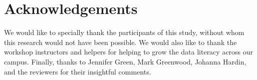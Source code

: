 \documentclass[12pt]{article}
\begin{document}


\section{Acknowledgements}

\noindent We would like to specially thank the participants of this study,
without whom this research would not have been possible. We would also like to
thank the workshop instructors and helpers for helping to grow the data
literacy across our campus. Finally, thanks to Jennifer Green, Mark Greenwood,
Johanna Hardin, and the reviewers for their insightful comments.  



\end{document}
